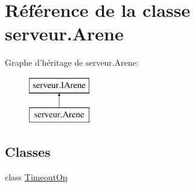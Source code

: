\hypertarget{classserveur_1_1_arene}{\section{Référence de la classe serveur.\-Arene}
\label{classserveur_1_1_arene}
}
Graphe d'héritage de serveur.\-Arene\-:\begin{figure}[H]
\begin{center}
\leavevmode
\includegraphics[height=2.000000cm]{classserveur_1_1_arene}
\end{center}
\end{figure}
\subsection*{Classes}
\begin{DoxyCompactItemize}
\item 
class \hyperlink{classserveur_1_1_arene_1_1_timeout_op}{Timeout\-Op}
\end{DoxyCompactItemize}
